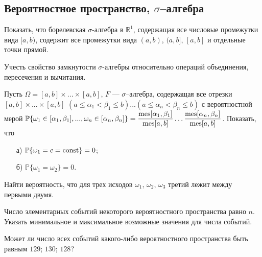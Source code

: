 \subsection{Вероятностное пространство, $\sigma$–алгебра}

\begin{problem}
Показать, что борелевская $\sigma$-алгебра в ${\mathbb R}^1$, содержащая все числовые промежутки вида $[a,b)$, 
содержит все промежутки вида $(a,b)$, $(a,b]$, $[a,b]$ и отдельные точки прямой. 

\begin{ordre}
Учесть свойство замкнутости $\sigma$-алгебры относительно операций 
объединения, пересечения и вычитания. 
\end{ordre}

\end{problem}


\begin{problem}
Пусть $\Omega = [a,b]\times...\times[a,b]$, $F$ --- $\sigma$–алгебра, содержащая все отрезки 
$[a,b]\times...\times[a,b]$ $(a \leqslant \alpha_1 < \beta_1 \leqslant b) ... (a \leqslant \alpha_n < \beta_n \leqslant b)$ с вероятностной мерой 
${\mathbb P}\{ \omega_1  \in [\alpha_1,\beta_1], ..., \omega_n  \in [\alpha_n,\beta_n]  \}=\dfrac{\mathrm{mes}[\alpha_1, \beta_1]}{\mathrm{mes}[a,b]}  \ldots  \dfrac{\mathrm{mes}[\alpha_n, \beta_n]}{\mathrm{mes}[a,b]}$. 
Показать, что 
\begin{enumerate}
\item[а)] ${\mathbb P}\{ \omega_1=c=\mathop{\mathrm{const}}\nolimits\}=0$; 
\item[б)] ${\mathbb P}\{ \omega_1=\omega_2\}=0$. 
\end{enumerate}
Найти вероятность, что для трех исходов $\omega_1$, $\omega_2$, $\omega_3$ третий лежит между первыми двумя. 
\end{problem}


\begin{problem}
Число элементарных событий некоторого вероятностного пространства равно $n$. Указать минимальное и максимальное возможные значения 
для числа событий. 
\end{problem}

\begin{problem}
Может ли число всех событий какого-либо вероятностного пространства быть равным $129$; $130$; $128$? 
\end{problem}


